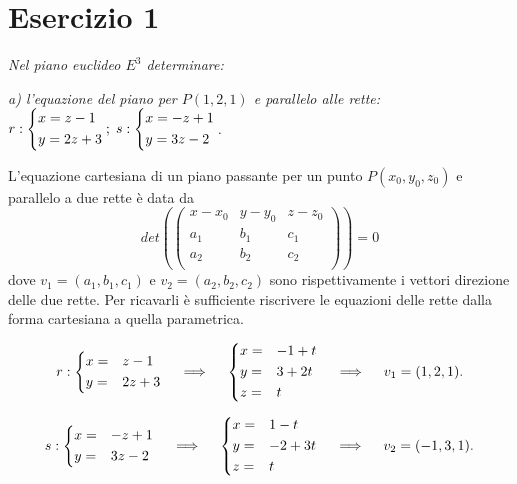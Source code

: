\documentclass[a4paper]{article}
\begin{document}
        \section*{Esercizio 1}
        \textsl{Nel piano euclideo $E^3$ determinare:}

        \noindent
        \textsl{
                a) l'equazione del piano per $P(1,2,1)$ e parallelo alle rette:
                $
                        r: \begin{dcases} x = z - 1 \\ y = 2z + 3 \end{dcases}; \;
                        s: \begin{dcases} x = -z + 1 \\ y = 3z - 2 \end{dcases}
                $.
        }

        L'equazione cartesiana di un piano passante per un punto $P(x_0, y_0, z_0)$ e parallelo a due rette \`{e} data da
        \[
                det(
                        \begin{pmatrix}
                                x - x_0 & y - y_0 & z - z_0 \\
                                a_1 & b_1 & c_1 \\
                                a_2 & b_2 & c_2 \\
                        \end{pmatrix}
                ) = 0
        \]
        dove $v_1 = (a_1, b_1, c_1)$ e $v_2 = (a_2, b_2, c_2)$ sono rispettivamente i vettori direzione delle due rette.
        Per ricavarli \`{e} sufficiente riscrivere le equazioni delle rette dalla forma cartesiana a quella parametrica.

        \[
                r: \begin{dcases}
                        x = & z - 1 \\
                        y = & 2z + 3
                \end{dcases} \quad \implies \quad
                \begin{dcases}
                        x = & -1 + t \\
                        y = & 3 + 2t \\
                        z = & t
                \end{dcases} \quad \implies \quad
                v_1 = (1, 2, 1).
        \]

        \[
                s: \begin{dcases}
                        x = & -z + 1 \\
                        y = & 3z - 2
                \end{dcases} \quad \implies \quad
                \begin{dcases}
                        x = & 1 - t \\
                        y = & -2 + 3t\\
                        z = & t
                \end{dcases} \quad \implies \quad
                v_2 = (-1, 3, 1).
        \]
\end{document}
